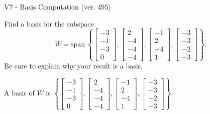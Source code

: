 \begin{exercise}
  \begin{exerciseTitle}V7 - Basis Computation (ver. 495)\end{exerciseTitle}
  \begin{exerciseStatement}
    Find a basis for the subspace 
\[W=\mathrm{span}\ \left\{\left[\begin{array}{r}
-3 \\
-1 \\
-3 \\
0
\end{array}\right] , \left[\begin{array}{r}
2 \\
-4 \\
-4 \\
-4
\end{array}\right] , \left[\begin{array}{r}
-1 \\
2 \\
-4 \\
1
\end{array}\right] , \left[\begin{array}{r}
-3 \\
-3 \\
-2 \\
-3
\end{array}\right]\right\}.\]
 Be sure to explain why your result is a basis.


  \end{exerciseStatement}
  \begin{exerciseAnswer}
   A basis of \(W\) is  \(\left\{\left[\begin{array}{r}
-3 \\
-1 \\
-3 \\
0
\end{array}\right] , \left[\begin{array}{r}
2 \\
-4 \\
-4 \\
-4
\end{array}\right] , \left[\begin{array}{r}
-1 \\
2 \\
-4 \\
1
\end{array}\right] , \left[\begin{array}{r}
-3 \\
-3 \\
-2 \\
-3
\end{array}\right]\right\}\).
  


  \end{exerciseAnswer}
\end{exercise}